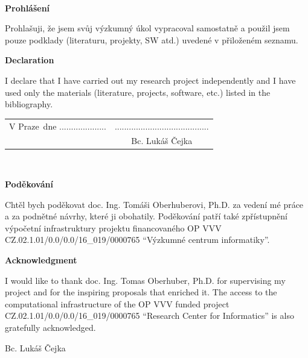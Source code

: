 \documentclass[11pt,twoside,czech,american]{book}
\newcommand{\tb}{\textbf} 								  									   %
\newcommand{\paperAuthor}{Bc. Lukáš Čejka}   				 %
\newcommand{\place}{Praze} 									 %
\newcommand{\declarationCZ}{Prohlašuji, že jsem svůj výzkumný úkol vypracoval samostatně a použil jsem pouze podklady (literaturu, projekty, SW atd.) uvedené v přiloženém seznamu.}
\newcommand{\declarationEN}{I declare that I have carried out my research project independently and I have used only the materials (literature, projects, software, etc.) listed in the bibliography.}
\newcommand{\acknowledgementCZ}{Chtěl bych poděkovat doc. Ing. Tomáši Oberhuberovi, Ph.D. za vedení mé práce a za podnětné návrhy, které ji obohatily. Poděkování patří také zpřístupnění výpočetní infrastruktury projektu financovaného OP VVV CZ.02.1.01/0.0/0.0/16\_019/0000765 ``Výzkumné centrum informatiky''.}
\newcommand{\acknowledgementEN}{I would like to thank doc. Ing. Tomas Oberhuber, Ph.D. for supervising my project and for the inspiring proposals that enriched it. The access to the computational infrastructure of the OP VVV funded project CZ.02.1.01/0.0/0.0/16\_019/0000765 ``Research Center for Informatics'' is also gratefully acknowledged.}
\begin{document}
\newpage 			  %
\thispagestyle{empty} %

~ 					  %
\vfill 				  %

\tb{Prohlášení} 	  %

\vspace{1em} 		  %
\declarationCZ

%
\vspace{1em}
\tb{Declaration}

\vspace{1em}
\declarationEN
{}%

\vspace{2em}  									 							    %
\hspace{-0.5em}\begin{tabularx}{\textwidth}{X c} 							    %
V \place\ dne .................... &........................................ \\ %
	& \paperAuthor
\end{tabularx} %




\newpage
\thispagestyle{empty}

~
\vfill %

\tb{Poděkování}

\vspace{1em} 				%
\acknowledgementCZ

%
\vspace{1em}
\tb{Acknowledgment}

%
\vspace{1em} 				%
\acknowledgementEN
\begin{flushright}
\paperAuthor
\end{flushright}  			%




\newpage   			  %
\thispagestyle{empty} %

\newbox\odstavecbox
\newlength\vyskaodstavce
\newcommand\odstavec[2]{%
    \setbox\odstavecbox=\hbox{%
         \parbox[t]{#1}{#2\vrule width 0pt depth 4pt}}%
    \global\vyskaodstavce=\dp\odstavecbox
    \box\odstavecbox}
\newcommand{\delka}{120mm} %
\end{document}

